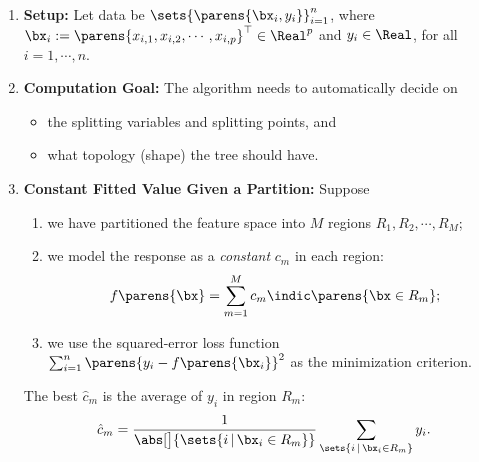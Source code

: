 \documentclass[12pt]{article}
\begin{document}
\begin{enumerate}[label=\textbf{\arabic*.}]
	
	\item \textbf{Setup:} Let data be $\sets{\parens{\bx_i, y_i}}_{i=1}^n$, where $\bx_{i} := \parens{x_{i,1}, x_{i,2}, \cdots, x_{i,p}}^\top \in \Real^p$ and $y_i \in \Real$, for all $i = 1, \cdots, n$. 
	
	\item \textbf{Computation Goal:} The algorithm needs to automatically decide on 
	\begin{itemize}
		\item the splitting variables and splitting points, and 
		\item what topology (shape) the tree should have. 
	\end{itemize}
	
	\item \textbf{Constant Fitted Value Given a Partition:} Suppose 
	\begin{enumerate}
		\item we have partitioned the feature space into $M$ regions $R_1, R_2, \cdots, R_M$; 
		\item we model the response as a \emph{constant} $c_m$ in each region: 
		\begin{align*}
			f \parens{\bx} = \sum_{m=1}^M c_m \indic \parens{\bx \in R_m}; 
		\end{align*}
		\item we use the squared-error loss function $\sum_{i=1}^n \parens{y_i - f \parens{\bx_i}}^2$ as the minimization criterion. 
	\end{enumerate}
	The best $\hat{c}_m$ is the average of $y_i$ in region $R_m$: 
	\begin{align}
		\hat{c}_m = \frac{1}{\abs[\big]{\sets{i \,\vert\, \bx_i \in R_m}}} \sum_{\sets{i \,\vert\, \bx_i \in R_m}} y_i. 
	\end{align}
	

\end{enumerate}
\end{document}
